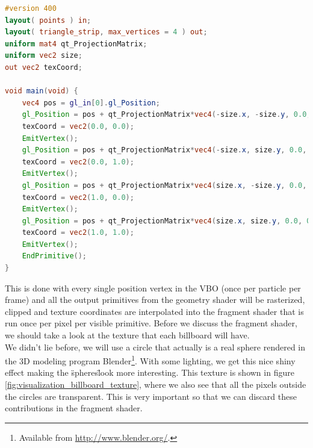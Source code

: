\begin{lstlisting}[caption=billboardGeometryShader.glsl, label=lst:simplegeometryshaderbillboard, language=GLSL]
#version 400
layout( points ) in;
layout( triangle_strip, max_vertices = 4 ) out;
uniform mat4 qt_ProjectionMatrix;
uniform vec2 size;
out vec2 texCoord;

void main(void) {
    vec4 pos = gl_in[0].gl_Position;
    gl_Position = pos + qt_ProjectionMatrix*vec4(-size.x, -size.y, 0.0, 0.0);
    texCoord = vec2(0.0, 0.0);
    EmitVertex();
    gl_Position = pos + qt_ProjectionMatrix*vec4(-size.x, size.y, 0.0, 0.0);
    texCoord = vec2(0.0, 1.0);
    EmitVertex();
    gl_Position = pos + qt_ProjectionMatrix*vec4(size.x, -size.y, 0.0, 0.0);
    texCoord = vec2(1.0, 0.0);
    EmitVertex();
    gl_Position = pos + qt_ProjectionMatrix*vec4(size.x, size.y, 0.0, 0.0);
    texCoord = vec2(1.0, 1.0);
    EmitVertex();
    EndPrimitive();
}
\end{lstlisting}
This is done with every single position vertex in the VBO (once per particle per frame) and all the output primitives from the geometry shader will be rasterized, clipped and texture coordinates are interpolated into the fragment shader that is run once per pixel per visible primitive. Before we discuss the fragment shader, we should take a look at the texture that each billboard will have.\\
We didn't lie before, we will use a circle that actually is a real sphere rendered in the 3D modeling program Blender\footnote{Available from \url{http://www.blender.org/}.}. With some lighting, we get this nice shiny effect making the \"spheres\" look more interesting. This texture is shown in figure \ref{fig:visualization_billboard_texture}, where we also see that all the pixels outside the circles are transparent. This is very important so that we can discard these contributions in the fragment shader.
